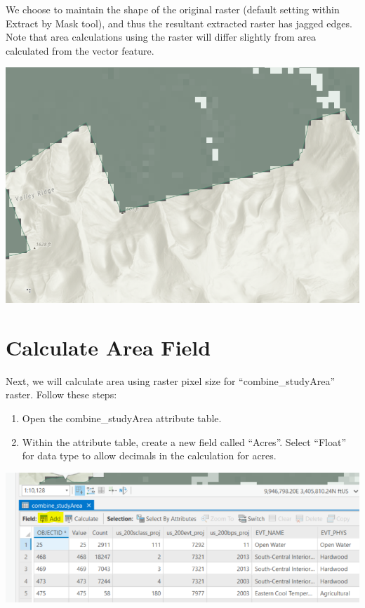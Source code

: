 \documentclass[
]{book}
\providecommand{\tightlist}{%
  \setlength{\itemsep}{0pt}\setlength{\parskip}{0pt}}
\begin{document}
We choose to maintain the shape of the original raster (default setting within Extract by Mask tool), and thus the resultant extracted raster has jagged edges. Note that area calculations using the raster will differ slightly from area calculated from the vector feature.

\includegraphics[width=1000px]{04_gis_screenshots/13_jagged_edge}

\hypertarget{calculate-area-field}{%
\section{Calculate Area Field}\label{calculate-area-field}}

Next, we will calculate area using raster pixel size for ``combine\_studyArea'' raster. Follow these steps:

\begin{enumerate}
\def\labelenumi{\arabic{enumi}.}
\tightlist
\item
  Open the combine\_studyArea attribute table.
\item
  Within the attribute table, create a new field called ``Acres''. Select ``Float'' for data type to allow decimals in the calculation for acres.
\end{enumerate}

\includegraphics[width=1000px]{04_gis_screenshots/14_add_acres_field}
\end{document}
